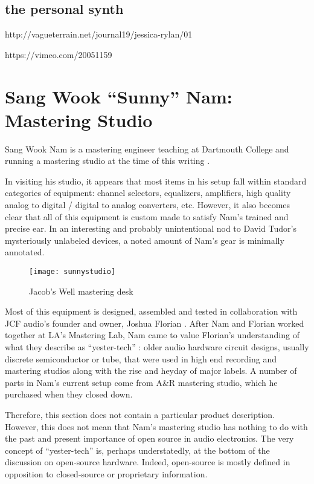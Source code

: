 \subsection{the personal synth}

http://vagueterrain.net/journal19/jessica-rylan/01

https://vimeo.com/20051159



\section{Sang Wook ``Sunny'' Nam: Mastering Studio}

Sang Wook Nam is a mastering engineer teaching at Dartmouth College and running a mastering studio at the time of this writing \cite{nam2015}. 

In visiting his studio, it appears that most items in his setup fall within standard categories of equipment: channel selectors, equalizers, amplifiers, high quality analog to digital / digital to analog converters, etc. However, it also becomes clear that all of this equipment is custom made to satisfy Nam's trained and precise ear. In an interesting and probably unintentional nod to David Tudor's mysteriously unlabeled devices, a noted amount of Nam's gear is minimally annotated. 

	\begin{figure}[h!]
	  \caption{Jacob's Well mastering desk}
	  \centering
	    \texttt{[image: sunnystudio]}
	\end{figure}
	
Most of this equipment is designed, assembled and tested in collaboration with JCF audio's founder and owner, Joshua Florian \cite{florian2015}. After Nam and Florian worked together at LA's Mastering Lab, Nam came to value Florian's understanding of what they describe as ``yester-tech'' \cite{florian2015b}: older audio hardware circuit designs, usually discrete semiconductor or tube, that were used in high end recording and mastering studios along with the rise and heyday of major labels. A number of parts in Nam's current setup come from A\&R mastering studio, which he purchased when they closed down. 

Therefore, this section does not contain a particular product description. However, this does not mean that Nam's mastering studio has nothing to do with the past and present importance of open source in audio electronics. The very concept of ``yester-tech'' is, perhaps understatedly, at the bottom of the discussion on open-source hardware. Indeed, open-source is mostly defined in opposition to closed-source or proprietary information.

